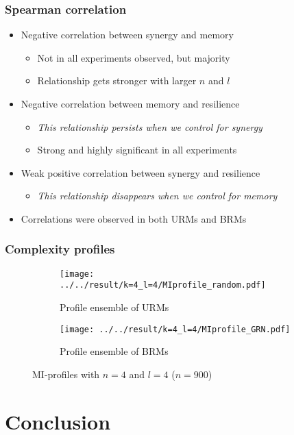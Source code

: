 \documentclass[hyperref={pdfpagelabels=false}]{beamer}
\begin{document}
\begin{frame}
\frametitle{Spearman correlation}
\begin{itemize}
\item Negative correlation between synergy and memory
\begin{itemize}
\item Not in all experiments observed, but majority
\item Relationship gets stronger with larger $n$ and $l$
\end{itemize}
\item Negative correlation between memory and resilience
\begin{itemize}
\item \textit{This relationship persists when we control for synergy}
\item Strong and highly significant in all experiments
\end{itemize}
\item Weak positive correlation between synergy and resilience
\begin{itemize}
\item \textit{This relationship disappears when we control for memory}
\end{itemize}
\item Correlations were observed in both URMs and BRMs
\end{itemize}
\end{frame}

\begin{frame}
\frametitle{Complexity profiles}
\begin{figure}[ht]
    \centering
    \begin{subfigure}[b]{0.4\textwidth}
        \texttt{[image: ../../result/k=4\_l=4/MIprofile\_random.pdf]}
        \caption{Profile ensemble of URMs}
    \end{subfigure}
    \begin{subfigure}[b]{0.4\textwidth}
        \texttt{[image: ../../result/k=4\_l=4/MIprofile\_GRN.pdf]}
        \caption{Profile ensemble of BRMs}
    \end{subfigure}
    \caption{MI-profiles with $n=4$ and $l=4$ ($n=900$)}
    \label{fig:profilel4}
\end{figure}
\end{frame}

\section{Conclusion}
\setcounter{subsection}{1}
\end{document}
